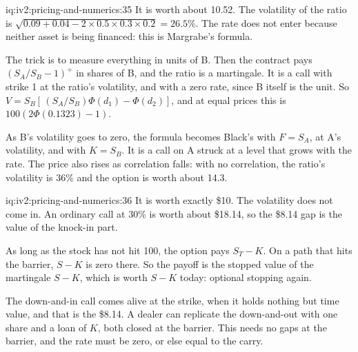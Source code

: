 \begin{solution}{iq:iv2:pricing-and-numerics:35}
It is worth about 10.52. The volatility of the ratio is $\sqrt{0.09 + 0.04 - 2 \times 0.5 \times 0.3 \times 0.2} = 26.5\%$. The rate does not enter because neither asset is being financed: this is Margrabe's formula.

The trick is to measure everything in units of B. Then the contract pays $(S_A/S_B - 1)^+$ in shares of B, and the ratio is a martingale. It is a call with strike 1 at the ratio's volatility, and with a zero rate, since B itself is the unit. So $V = S_B[\,(S_A/S_B)\Phi(d_1) - \Phi(d_2)]$, and at equal prices this is $100(2\Phi(0.1323) - 1)$.

As B's volatility goes to zero, the formula becomes Black's with $F = S_A$, at A's volatility, and with $K = S_B$. It is a call on A struck at a level that grows with the rate. The price also rises as correlation falls: with no correlation, the ratio's volatility is 36\% and the option is worth about 14.3.

\end{solution}

\begin{solution}{iq:iv2:pricing-and-numerics:36}
It is worth exactly \$10. The volatility does not come in. An ordinary call at 30\% is worth about \$18.14, so the \$8.14 gap is the value of the knock-in part.

As long as the stock has not hit 100, the option pays $S_T - K$. On a path that hits the barrier, $S - K$ is zero there. So the payoff is the stopped value of the martingale $S - K$, which is worth $S - K$ today: optional stopping again.

The down-and-in call comes alive at the strike, when it holds nothing but time value, and that is the \$8.14. A dealer can replicate the down-and-out with one share and a loan of $K$, both closed at the barrier. This needs no gaps at the barrier, and the rate must be zero, or else equal to the carry.

\end{solution}


